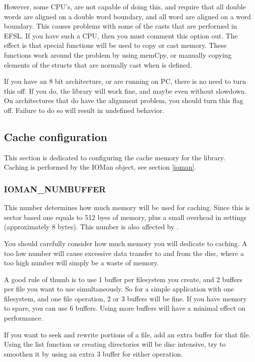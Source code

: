 However, some CPU's, are not capable of doing this, and require that all double words
are aligned on a double word boundary, and all word are aligned on a word boundary.
This causes problems with some of the casts that are performed in EFSL. If you have such
a CPU, then you must comment this option out. The effect is that special functions
will be used to copy or cast memory. These functions work around the problem by
using memCpy, or manually copying elements of the structs that are normally cast when
 is defined.

If you have an 8 bit architecture, or are running on PC, there is no need to turn this
off. If you do, the library will work fine, and maybe even without slowdown.
On architectures that do have the alignment problem, you should turn this flag off.
Failure to do so will result in undefined behavior.

\subsection{Cache configuration}
This section is dedicated to configuring the cache memory for the library. Caching
is performed by the IOMan object, see section \ref{ioman}.
\subsubsection*{IOMAN\_NUMBUFFER}
This number determines how much memory will be used for caching. Since this
is sector based one  equals to 512 byes of memory, plus
a small overhead in settings (approximately 8 bytes). This number is also affected
by . 

You should carefully consider how much memory you will dedicate to caching. A too
low number will cause excessive data transfer to and from the disc, where a too high
number will simply be a waste of memory.

A good rule of thumb is to use 1 buffer per filesystem you create, and 2 buffers
per file you want to use simultaneously. So for a simple application with
one filesystem, and one file operation, 2 or 3 buffers will be fine. If you have memory
to spare, you can use 6 buffers. Using more buffers will have a minimal effect on
performance.

If you want to seek and rewrite portions of a file, add an extra buffer for that file.
Using the list function or creating directories will be disc intensive, try to smoothen
it by using an extra 3 buffer for either operation.

